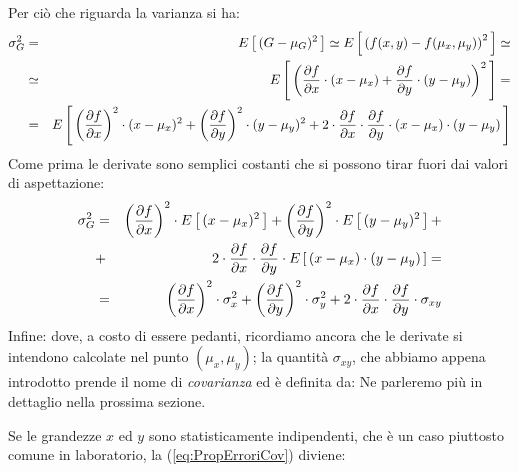 Per ci\`o che riguarda la varianza si ha:
\begin{eqnarray*}
\sigma_G^2 & = & \displaystyle E\left[\, (G - \mu_G)^2 \, \right]
\simeq \displaystyle E\left[\, \left( f(x,y) - f(\mu_x,\mu_y) \right)^2  \, \right] \simeq \\
& \simeq & \displaystyle E\left[\, \left(
\displaystyle \frac{\partial f}{\partial x} \cdot (x - \mu_x) +
\displaystyle \frac{\partial f}{\partial y} \cdot (y - \mu_y)
\right)^2 \, \right] = \\
& = & E \left[\,
\left(\displaystyle \frac{\partial f}{\partial x}\right)^2 \cdot (x - \mu_x)^2 +
\left(\displaystyle \frac{\partial f}{\partial y} \right)^2 \cdot (y - \mu_y)^2 +
2 \cdot \displaystyle \frac{\partial f}{\partial x} \cdot \displaystyle \frac{\partial f}{\partial y} \cdot
(x - \mu_x) \cdot (y - \mu_y) \, \right]
\end{eqnarray*}
Come prima le derivate sono semplici costanti che si possono
tirar fuori dai valori di aspettazione:
\begin{eqnarray*}
\sigma_G^2 & = &
\left(\displaystyle \frac{\partial f}{\partial x} \right)^2 \cdot \displaystyle E\left[\, (x - \mu_x)^2 \, \right] +
\left(\displaystyle \frac{\partial f}{\partial y} \right)^2 \cdot \displaystyle E\left[\, (y - \mu_y)^2 \, \right] +\\
& + & 2 \cdot \displaystyle \frac{\partial f}{\partial x} \cdot
\displaystyle \frac{\partial f}{\partial y} \cdot \displaystyle E\left[\, (x - \mu_x)\cdot(y - \mu_y) \, \right] =\\
& = & 
\left(\displaystyle \frac{\partial f}{\partial x} \right)^2 \cdot \sigma_x^2 +
\left(\displaystyle \frac{\partial f}{\partial y} \right)^2 \cdot \sigma_y^2 +
2 \cdot \displaystyle \frac{\partial f}{\partial x} \cdot \displaystyle \frac{\partial f}{\partial y} \cdot \sigma_{xy}\\
\end{eqnarray*}
Infine:
dove, a costo di essere pedanti, ricordiamo ancora che le derivate si
intendono calcolate nel punto $(\mu_x, \mu_y)$; la quantit\`a $\sigma_{xy}$,
che abbiamo appena introdotto prende il nome di {\itshape covarianza} ed
\`e definita da:
Ne parleremo pi\`u in dettaglio nella prossima sezione.

Se le grandezze $x$ ed $y$ sono statisticamente indipendenti, che \`e un
caso piuttosto comune in laboratorio, la (\ref{eq:PropErroriCov}) diviene:

